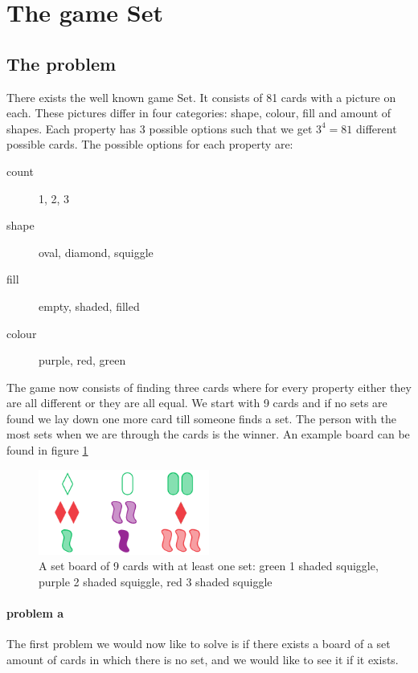 \documentclass[12pt]{scrartcl}
\begin{document}
\section{The game Set}
\subsection{The problem}
There exists the well known game Set. It consists of 81 cards with a picture on each. These pictures differ in four categories: shape, colour, fill and amount of shapes. Each property has 3 possible options such that we get $3^4 = 81$ different possible cards. The possible options for each property are:
\begin{description}
    \item[count] 1, 2, 3
    \item[shape] oval, diamond, squiggle
    \item[fill] empty, shaded, filled
    \item[colour] purple, red, green 
\end{description}

The game now consists of finding three cards where for every property either they are all different or they are all equal. We start with 9 cards and if no sets are found we lay down one more card till someone finds a set. The person with the most sets when we are through the cards is the winner. An example board can be found in figure \ref*{fig:set}

\begin{figure}[h]
    \centering
    \includegraphics[width=0.5\textwidth]{set_board.png}
    \caption{A set board of 9 cards with at least one set: green 1 shaded squiggle, purple 2 shaded squiggle, red 3 shaded squiggle}
    \label{fig:set}
\end{figure}

\paragraph{problem a}
The first problem we would now like to solve is if there exists a board of a set amount of cards in which there is no set, and we would like to see it if it exists.
\end{document}
